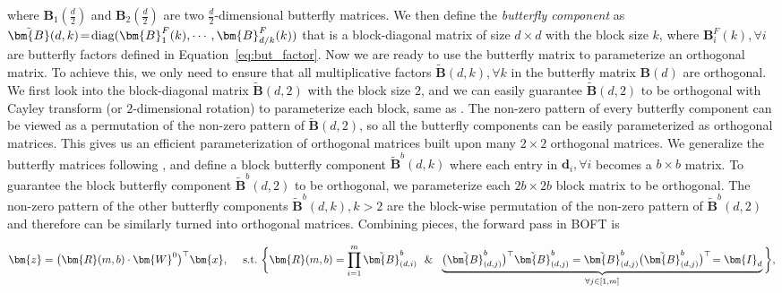 where $\bm{B}_1(\frac{d}{2})$ and $\bm{B}_2(\frac{d}{2})$ are two $\frac{d}{2}$-dimensional butterfly matrices. We then define the \emph{butterfly component} as $\thickmuskip=2mu \medmuskip=2mu \tilde{\bm{B}}(d,k)=\text{diag}(\bm{B}^F_1(k),\cdots,\bm{B}^F_{d/k}(k))$ that is a block-diagonal matrix of size $d\times d$ with the block size $k$, where $\bm{B}^F_i(k),\forall i$ are butterfly factors defined in Equation~\ref{eq:but_factor}. Now we are ready to use the butterfly matrix to parameterize an orthogonal matrix. To achieve this, we only need to ensure that all multiplicative factors $\tilde{\bm{B}}(d,k),\forall k$ in the butterfly matrix $\bm{B}(d)$ are orthogonal. We first look into the block-diagonal matrix $\tilde{\bm{B}}(d,2)$ with the block size $2$, and we can easily guarantee $\tilde{\bm{B}}(d,2)$ to be orthogonal with Cayley transform (or $2$-dimensional rotation) to parameterize each block, same as \cite{liu2021orthogonal,qiu2023controlling}. The non-zero pattern of every butterfly component can be viewed as a permutation of the non-zero pattern of $\tilde{\bm{B}}(d,2)$, so all the butterfly components can be easily parameterized as orthogonal matrices. This gives us an efficient parameterization of orthogonal matrices built upon many $2\times 2$ orthogonal matrices. We generalize the butterfly matrices following \cite{chen2022pixelated}, and define a block butterfly component $\tilde{\bm{B}}^b(d,k)$ where each entry in $\bm{d}_i,\forall i$ becomes a $b\times b$ matrix. To guarantee the block butterfly component $\tilde{\bm{B}}^b(d,2)$ to be orthogonal, we parameterize each $2b\times 2b$ block matrix to be orthogonal. The non-zero pattern of the other butterfly components $\tilde{\bm{B}}^b(d,k),k>2$ are the block-wise permutation of the non-zero pattern of $\tilde{\bm{B}}^b(d,2)$ and therefore can be similarly turned into orthogonal matrices. Combining pieces, the forward pass in BOFT is

\begin{equation}
    \begin{aligned}\nonumber
    \bm{z}=\big(\bm{R}(m,b)\cdot\bm{W}^0\big)^\top\bm{x},~~~~\text{s.t.}~\bigg{\{}\bm{R}(m,b)=\prod_{i=1}^m \tilde{\bm{B}}^b_{(d,i)}~~\&~~\underbrace{\big(\tilde{\bm{B}}^b_{(d,j)}\big)^\top\tilde{\bm{B}}^b_{(d,j)}=\tilde{\bm{B}}^b_{(d,j)}\big(\tilde{\bm{B}}^b_{(d,j)}\big)^\top\!=\bm{I}_d}_{\forall j\in [1, m]}\bigg{\}},
    \end{aligned}
\end{equation}

